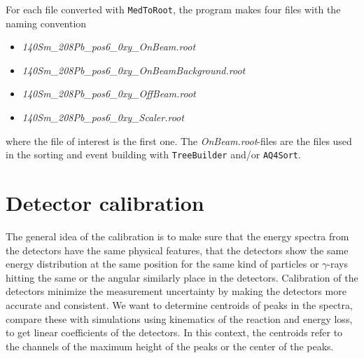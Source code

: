 \documentclass[twoside,english]{uiofysmaster/uiofysmaster}
\newcommand{\ga}{$\gamma$}
\begin{document}
For each file converted with \texttt{MedToRoot}, the program makes four files with the naming convention
\begin{itemize}
	\item \textit{140Sm\_208Pb\_pos6\_0xy\_OnBeam.root} 
	\item \textit{140Sm\_208Pb\_pos6\_0xy\_OnBeamBackground.root}
	\item \textit{140Sm\_208Pb\_pos6\_0xy\_OffBeam.root}
	\item \textit{140Sm\_208Pb\_pos6\_0xy\_Scaler.root} 
\end{itemize}
where the file of interest is the first one. The \textit{OnBeam.root}-files are the files used in the sorting and event building with \texttt{TreeBuilder} and/or \texttt{AQ4Sort}.


\section{Detector calibration}


%

The general idea of the calibration is to make sure that the energy spectra from the detectors have the same physical features, that the detectors show the same energy distribution at the same position for the same kind of particles or \ga-rays hitting the same or the angular similarly place in the detectors.
Calibration of the detectors minimize the measurement uncertainty by making the detectors more accurate and consistent.
We want to determine centroids of peaks in the spectra, compare these with simulations using kinematics of the reaction and energy loss, to get linear coefficients of the detectors. 
In this context, the centroids refer to the channels of the maximum height of the peaks or the center of the peaks. 
\end{document}

